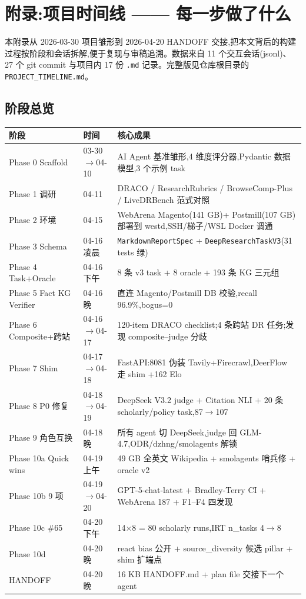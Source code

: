 \documentclass[UTF8,11pt]{ctexart}
\begin{document}
\appendix

\section{附录:项目时间线 —— 每一步做了什么}
\label{appendix:timeline}

本附录从 2026-03-30 项目雏形到 2026-04-20 HANDOFF 交接,把本文背后的构建
过程按阶段和会话拆解,便于复现与审稿追溯。数据来自 11 个交互会话(jsonl)、
27 个 git commit 与项目内 17 份 \texttt{.md} 记录。完整版见仓库根目录的
\texttt{PROJECT\_TIMELINE.md}。

\subsection{阶段总览}

\begin{center}
\small
\begin{tabular}{@{}p{2.3cm}p{2.5cm}p{8.0cm}@{}}
\toprule
\textbf{阶段} & \textbf{时间} & \textbf{核心成果} \\
\midrule
Phase 0 Scaffold & 03-30$\to$04-10 & AI Agent 基准雏形,4 维度评分器,Pydantic 数据模型,3 个示例 task \\
Phase 1 调研 & 04-11 & DRACO / ResearchRubrics / BrowseComp-Plus / LiveDRBench 范式对照 \\
Phase 2 环境 & 04-15 & WebArena Magento(141 GB)+ Postmill(107 GB)部署到 westd,SSH/梯子/WSL Docker 调通 \\
Phase 3 Schema & 04-16 凌晨 & \texttt{MarkdownReportSpec} + \texttt{DeepResearchTaskV3}(31 tests 绿) \\
Phase 4 Task+Oracle & 04-16 下午 & 8 条 v3 task + 8 oracle + 193 条 KG 三元组 \\
Phase 5 Fact KG Verifier & 04-16 晚 & 直连 Magento/Postmill DB 校验,recall 96.9\%,bogus=0 \\
Phase 6 Composite+跨站 & 04-16$\to$04-17 & 120-item DRACO checklist;4 条跨站 DR 任务;发现 composite--judge 分歧 \\
Phase 7 Shim & 04-17$\to$04-18 & FastAPI:8081 伪装 Tavily+Firecrawl,DeerFlow 走 shim +162 Elo \\
Phase 8 P0 修复 & 04-18$\to$04-19 & DeepSeek V3.2 judge + Citation NLI + 20 条 scholarly/policy task,87$\to$107 \\
Phase 9 角色互换 & 04-18 晚 & 所有 agent 切 DeepSeek,judge 回 GLM-4.7,ODR/dzhng/smolagents 解锁 \\
Phase 10a Quick wins & 04-19 上午 & 49 GB 全英文 Wikipedia + smolagents 哨兵修 + oracle v2 \\
Phase 10b 9 项 & 04-19$\to$04-20 & GPT-5-chat-latest + Bradley-Terry CI + WebArena 187 + F1--F4 四发现 \\
Phase 10c \#65 & 04-20 下午 & 14$\times$8 = 80 scholarly runs,IRT n\_tasks 4$\to$8 \\
Phase 10d & 04-20 晚 & react bias 公开 + source\_diversity 候选 pillar + shim 扩端点 \\
HANDOFF & 04-20 晚 & 16 KB HANDOFF.md + plan file 交接下一个 agent \\
\bottomrule
\end{tabular}
\end{center}
\end{document}
